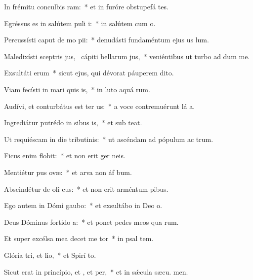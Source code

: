 \item In frémitu conculbis ram:~* et in furóre obstupefá tes.
\item Egréssus es in salútem puli i:~* in salútem cum  o.
\item Percussísti caput de mo pii:~* denudásti fundaméntum ejus us  lum.
\item Maledixísti sceptris jus,~\pscross{} cápiti bellarum jus,~* veniéntibus ut turbo ad dum me.
\item Exsultáti erum~* sicut ejus, qui dévorat páuperem  dito.
\item Viam fecísti in mari quis is,~* in luto aquá rum.
\item Audívi, et conturbátus est ter us:~* a voce contremuérunt lá a.
\item Ingrediátur putrédo in sibus is,~* et sub  teat.
\item Ut requiéscam in die tributinis:~* ut ascéndam ad pópulum ac trum.
\item Ficus enim  flobit:~* et non erit ger  neis.
\item Mentiétur pus ovæ:~* et arva non áf bum.
\item Abscindétur de oli cus:~* et non erit arméntum  pibus.
\item Ego autem in Dómi gaubo:~* et exsultábo in Deo  o.
\item Deus Dóminus fortido a:~* et ponet pedes meos qua rum.
\item Et super excélsa mea decet me tor~* in psal tem.
\item Glória tri, et lio,~* et Spirí to.
\item Sicut erat in princípio, et , et per,~* et in sǽcula sæcu. men.
